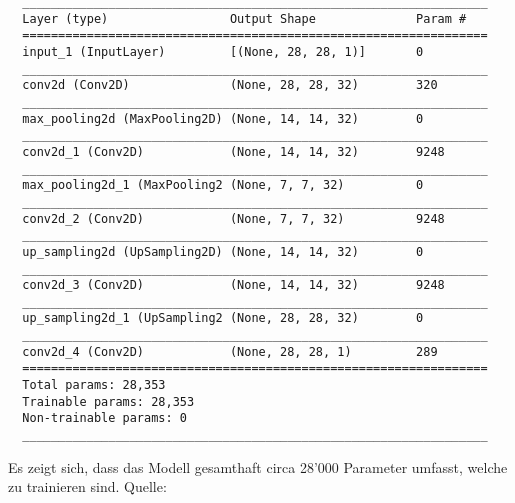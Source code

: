 \begin{verbatim}
  _________________________________________________________________
  Layer (type)                 Output Shape              Param #
  =================================================================
  input_1 (InputLayer)         [(None, 28, 28, 1)]       0
  _________________________________________________________________
  conv2d (Conv2D)              (None, 28, 28, 32)        320
  _________________________________________________________________
  max_pooling2d (MaxPooling2D) (None, 14, 14, 32)        0
  _________________________________________________________________
  conv2d_1 (Conv2D)            (None, 14, 14, 32)        9248
  _________________________________________________________________
  max_pooling2d_1 (MaxPooling2 (None, 7, 7, 32)          0
  _________________________________________________________________
  conv2d_2 (Conv2D)            (None, 7, 7, 32)          9248
  _________________________________________________________________
  up_sampling2d (UpSampling2D) (None, 14, 14, 32)        0
  _________________________________________________________________
  conv2d_3 (Conv2D)            (None, 14, 14, 32)        9248
  _________________________________________________________________
  up_sampling2d_1 (UpSampling2 (None, 28, 28, 32)        0
  _________________________________________________________________
  conv2d_4 (Conv2D)            (None, 28, 28, 1)         289
  =================================================================
  Total params: 28,353
  Trainable params: 28,353
  Non-trainable params: 0
  _________________________________________________________________
\end{verbatim}
Es zeigt sich, dass das Modell gesamthaft circa 28'000 Parameter umfasst,
welche zu trainieren sind.
\para{}
Quelle: \cite{net:keras_tut}

